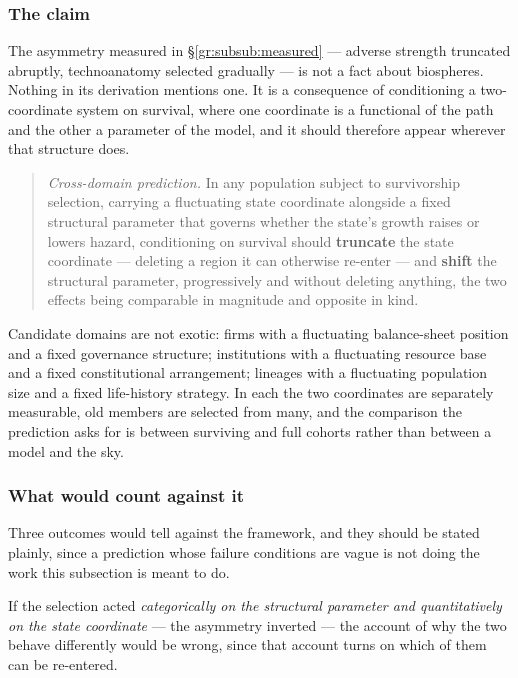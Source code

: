 \documentclass[11pt]{article}
\numberwithin{equation}{section}
\theoremstyle{plain}
\theoremstyle{definition}
\theoremstyle{remark}
\begin{document}
\subsubsection{The claim}\label{gr:subsub:crossclaim}

The asymmetry measured in \S\ref{gr:subsub:measured} --- adverse
strength truncated abruptly, technoanatomy selected gradually --- is not
a fact about biospheres. Nothing in its derivation mentions one. It is a
consequence of conditioning a two-coordinate system on survival, where
one coordinate is a functional of the path and the other a parameter of
the model, and it should therefore appear wherever that structure does.

\begin{quote}
\emph{Cross-domain prediction.} In any population subject to
survivorship selection, carrying a fluctuating state coordinate
alongside a fixed structural parameter that governs whether the state's
growth raises or lowers hazard, conditioning on survival should
\textbf{truncate} the state coordinate --- deleting a region it can
otherwise re-enter --- and \textbf{shift} the structural parameter,
progressively and without deleting anything, the two effects being
comparable in magnitude and opposite in kind.
\end{quote}

Candidate domains are not exotic: firms with a fluctuating balance-sheet
position and a fixed governance structure; institutions with a
fluctuating resource base and a fixed constitutional arrangement;
lineages with a fluctuating population size and a fixed life-history
strategy. In each the two coordinates are separately measurable, old
members are selected from many, and the comparison the prediction asks
for is between surviving and full cohorts rather than between a model
and the sky.

\subsubsection{What would count against it}
\label{gr:subsub:crossfalsify}

Three outcomes would tell against the framework, and they should be stated plainly, since a prediction whose failure conditions are vague
is not doing the work this subsection is meant to do.

If the selection acted \emph{categorically on the structural parameter
and quantitatively on the state coordinate} --- the asymmetry inverted
--- the account of why the two behave differently would be wrong, since
that account turns on which of them can be re-entered.
\end{document}
